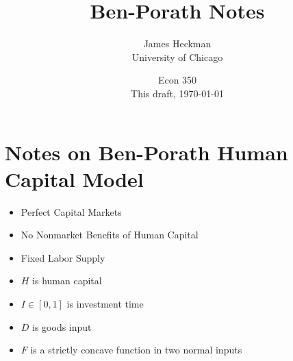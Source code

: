 \documentclass[12pt,compress,handout]{beamer}  %
\begin{document}
\title{Ben-Porath Notes}

\author{James Heckman\\University of Chicago}

\date{Econ 350\\
This draft, \today}


\frame{\titlepage}


\section[Human Capital]{Notes on Ben-Porath Human Capital Model}


\begin{frame}
\begin{center}
\textbf{\insertsection}
\end{center}
\begin{itemize}[<+->]
\item Perfect Capital Markets

\item No Nonmarket Benefits of Human Capital

\item Fixed Labor Supply

\item $H$ is human capital

\item $I \in [0,1]$ is investment time

\item $D$ is goods input

\item $F$ is a strictly concave function in two normal inputs
\end{itemize}
\end{frame}
\end{document}
